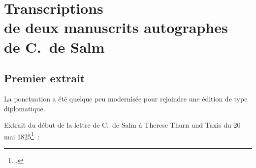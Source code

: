 \documentclass[a4paper,12pt,twoside]{book}
\begin{document}
	\chapter{Transcriptions \\de deux manuscrits autographes \\de C.~de Salm}
		\label{autographes}
		
		\section{Premier extrait}
	
			La ponctuation a été quelque peu modernisée pour rejoindre une édition de type diplomatique.
		
			Extrait du début de la lettre de C.~de Salm à Therese Thurn und Taxis du 20 mai 1825\footcite{CdS67022030}~:
			
\end{document}
